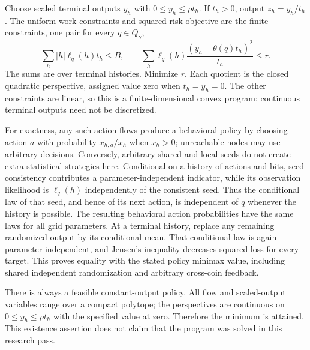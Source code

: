 Choose scaled terminal outputs $y_h$ with $0\le y_h\le\rho t_h$. If $t_h>0$,
output $z_h=y_h/t_h$. The uniform work constraints and squared-risk objective
are the finite constraints, one pair for every $q\in Q_\gamma$,
\[
 \sum_h |h|\ell_q(h)t_h\le B,\qquad
 \sum_h\ell_q(h)\frac{(y_h-\theta(q)t_h)^2}{t_h}\le r.
\]
The sums are over terminal histories. Minimize $r$. Each quotient is the
closed quadratic perspective, assigned value zero when $t_h=y_h=0$.
The other constraints are linear, so this is a finite-dimensional convex
program; continuous terminal outputs need not be discretized.

For exactness, any such action flows produce a behavioral policy by choosing
action $a$ with probability $x_{h,a}/x_h$ when $x_h>0$; unreachable nodes may
use arbitrary decisions. Conversely, arbitrary shared and local seeds do
not create extra statistical strategies here. Conditional on a history of
actions and bits, seed consistency contributes a parameter-independent
indicator, while its observation likelihood is $\ell_q(h)$ independently
of the consistent seed. Thus the conditional law of that seed, and hence of
its next action, is independent of $q$ whenever the history is possible.
The resulting behavioral action probabilities have the same laws for all
grid parameters. At a terminal history, replace any remaining randomized
output by its conditional mean. That conditional law is again parameter
independent, and Jensen's inequality decreases squared loss for every
target. This proves equality with the stated policy minimax value, including
shared independent randomization and arbitrary cross-coin feedback.

There is always a feasible constant-output policy. All flow and scaled-output
variables range over a compact polytope; the perspectives are continuous
on $0\le y_h\le\rho t_h$ with the specified value at zero. Therefore the
minimum is attained. This existence assertion does not claim that the
program was solved in this research pass.
